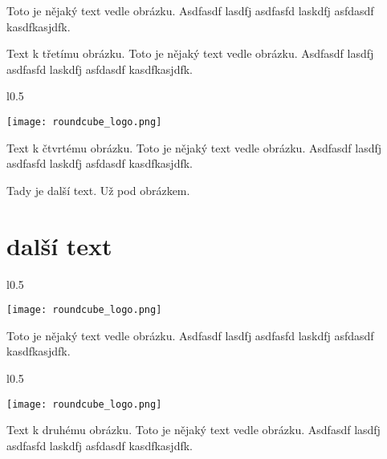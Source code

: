 \documentclass[12pt,a4paper,twoside]{book}
\begin{document}
Toto je nějaký text vedle obrázku. Asdfasdf lasdfj asdfasfd laskdfj asfdasdf kasdfkasjdfk.
\newline

Text k třetímu obrázku. Toto je nějaký text vedle obrázku. Asdfasdf lasdfj asdfasfd laskdfj asfdasdf kasdfkasjdfk.
\newline

\begin{wrapfigure}{l}{0.5\textwidth}
  \vspace{-20pt}
  \begin{center}
    \texttt{[image: roundcube\_logo.png]}
  \end{center}
  \vspace{-20pt}
\end{wrapfigure}

Text k čtvrtému obrázku. Toto je nějaký text vedle obrázku. Asdfasdf lasdfj asdfasfd laskdfj asfdasdf kasdfkasjdfk.
\newline


Tady je další text. Už pod obrázkem.

\section{další  text}

\begin{wrapfigure}{l}{0.5\textwidth}
  \vspace{-30pt}
  \begin{center}
    \texttt{[image: roundcube\_logo.png]}
  \end{center}
  \vspace{-10pt}
\end{wrapfigure}

Toto je nějaký text vedle obrázku. Asdfasdf lasdfj asdfasfd laskdfj asfdasdf kasdfkasjdfk.
\newline

\begin{wrapfigure}{l}{0.5\textwidth}
  \vspace{-20pt}
  \begin{center}
    \texttt{[image: roundcube\_logo.png]}
  \end{center}
  \vspace{-20pt}
\end{wrapfigure}

Text k druhému obrázku. Toto je nějaký text vedle obrázku. Asdfasdf lasdfj asdfasfd laskdfj asfdasdf kasdfkasjdfk.
\newline
\end{document}

